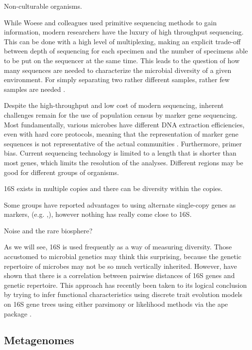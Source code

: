 \documentclass{amsart}
\begin{document}
Non-culturable organisms.

While Woese and colleagues used primitive sequencing methods to gain information, modern researchers have the luxury of high throughput sequencing.
This can be done with a high level of multiplexing, making an explicit trade-off between depth of sequencing for each specimen and the number of specimens able to be put on the sequencer at the same time.
This leads to the question of how many sequences are needed to characterize the microbial diversity of a given environment.
For simply separating two rather different samples, rather few samples are needed \cite{kuczynski2010microbial}.

Despite the high-throughput and low cost of modern sequencing, inherent challenges remain for the use of population census by marker gene sequencing.
Most fundamentally, various microbes have different DNA extraction efficiencies, even with hard core protocols, meaning that the representation of marker gene sequences is not representative of the actual communities \cite{morgan2010metagenomic}.
Furthermore, primer bias.
Current sequencing technology is limited to a length that is shorter than most genes, which limits the resolution of the analyses.
Different regions may be good for different groups of organisms.

16S exists in multiple copies and there can be diversity within the copies.
\citet{kembel2012incorporating}

Some groups have reported advantages to using alternate single-copy genes as markers, (e.g. \cite{case2007rpob},\cite{mcnabb2004hsp65}), however nothing has really come close to 16S.

Noise and the rare biosphere?

As we will see, 16S is used frequently as a way of measuring diversity.
Those accustomed to microbial genetics may think this surprising, because the genetic repertoire of microbes may not be so much vertically inherited.
However, \citep{zaneveld2010ribosomal} have shown that there is a correlation between pairwise distances of 16S genes and genetic repertoire.
This approach has recently been taken to its logical conclusion by trying to infer functional characteristics using discrete trait evolution models on 16S gene trees \citep{langille2013predictive} using either parsimony \citep{kluge1969quantitative} or likelihood \citep{pagel1994detecting} methods via the ape package \citep{paradis2004ape}.


\subsection{Metagenomes}
\end{document}
